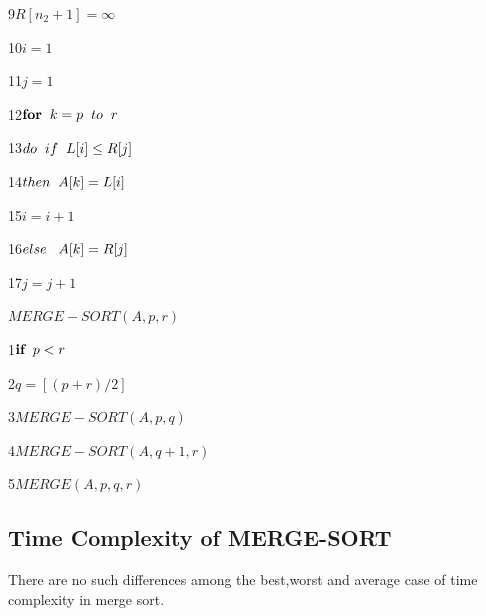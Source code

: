 \documentclass[9 pt]{report}
\begin{document}
9\hspace{0.6cm}$R[n_2+1]=\infty$

10\hspace{0.5cm}$i=1$

11\hspace{0.5cm}$j=1$

12\hspace{0.5cm}$\textbf{for}\hspace{0.2cm}k=p\hspace{0.2cm}to\hspace{0.2cm}r$

13\hspace{1cm}$do\hspace{0.2cm}if\hspace{0.2cm}L[i]\leq R[j]$

14\hspace{1.5cm}$then\hspace{0.2cm}A[k]=L[i]$

15\hspace{1.5cm}$i=i+1$

16\hspace{1cm}$else\hspace{0.3cm}A[k]=R[j]$

17\hspace{1.5cm}$j=j+1$

\vspace{1cm}

$MERGE-SORT(A,p,r)$

1\hspace{0.5cm}$\textbf{if}\hspace{0.2cm}p<r$

2\hspace{1cm}$q=\left [(p+r)/2\right]$

3\hspace{1cm}$MERGE-SORT(A,p,q)$

4\hspace{1cm}$MERGE-SORT(A,q+1,r)$

5\hspace{1cm}$MERGE(A,p,q,r)$

\subsection{Time Complexity of MERGE-SORT}

\vspace{1cm}

There are no such differences among the best,worst and average case of time complexity in merge sort.
\end{document}
